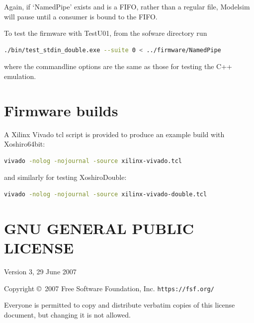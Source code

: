 \documentclass{article}
\begin{document}
Again, if `NamedPipe' exists and is a FIFO, rather than a regular file, Modelsim will pause until a consumer is bound to the FIFO.

To test the firmware with TestU01, from the sofware directory run 

\begin{minipage}{1.0\textwidth}
\centering
\begin{lstlisting}[language=bash, label=lst:TestU01PipeDouble]
./bin/test_stdin_double.exe --suite 0 < ../firmware/NamedPipe
\end{lstlisting}
\end{minipage}

where the commandline options are the same as those for testing the C++ emulation.

\section{Firmware builds}

A Xilinx Vivado tcl script is provided to produce an example build with Xoshiro64bit:

\begin{minipage}{1.0\textwidth}
\centering
\begin{lstlisting}[language=bash, label=lst:Vivado]
vivado -nolog -nojournal -source xilinx-vivado.tcl
\end{lstlisting}
\end{minipage} 

and similarly for testing XoshiroDouble:

\begin{minipage}{1.0\textwidth}
\centering
\begin{lstlisting}[language=bash, label=lst:VivadoDouble]
vivado -nolog -nojournal -source xilinx-vivado-double.tcl
\end{lstlisting}
\end{minipage} 


\newpage
\section{GNU GENERAL PUBLIC LICENSE}

\begin{center}
{\parindent 0in

Version 3, 29 June 2007

\bigskip
Copyright \copyright\  2007 Free Software Foundation, Inc. \texttt{https://fsf.org/}

\bigskip
Everyone is permitted to copy and distribute verbatim copies of this
license document, but changing it is not allowed.}

\end{center}
\end{document}
